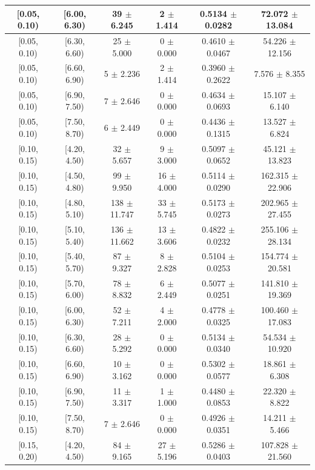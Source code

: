 \begin{longtable}{|c|c|c|c|c|c|}
\hline
[0.05, 0.10) & [6.00, 6.30) & 39 $\pm$ 6.245 & 2 $\pm$ 1.414 & 0.5134 $\pm$ 0.0282 & 72.072 $\pm$ 13.084 \\ 
\hline
[0.05, 0.10) & [6.30, 6.60) & 25 $\pm$ 5.000 & 0 $\pm$ 0.000 & 0.4610 $\pm$ 0.0467 & 54.226 $\pm$ 12.156 \\ 
\hline
[0.05, 0.10) & [6.60, 6.90) & 5 $\pm$ 2.236 & 2 $\pm$ 1.414 & 0.3960 $\pm$ 0.2622 & 7.576 $\pm$ 8.355 \\ 
\hline
[0.05, 0.10) & [6.90, 7.50) & 7 $\pm$ 2.646 & 0 $\pm$ 0.000 & 0.4634 $\pm$ 0.0693 & 15.107 $\pm$ 6.140 \\ 
\hline
[0.05, 0.10) & [7.50, 8.70) & 6 $\pm$ 2.449 & 0 $\pm$ 0.000 & 0.4436 $\pm$ 0.1315 & 13.527 $\pm$ 6.824 \\ 
\hline
[0.10, 0.15) & [4.20, 4.50) & 32 $\pm$ 5.657 & 9 $\pm$ 3.000 & 0.5097 $\pm$ 0.0652 & 45.121 $\pm$ 13.823 \\ 
\hline
[0.10, 0.15) & [4.50, 4.80) & 99 $\pm$ 9.950 & 16 $\pm$ 4.000 & 0.5114 $\pm$ 0.0290 & 162.315 $\pm$ 22.906 \\ 
\hline
[0.10, 0.15) & [4.80, 5.10) & 138 $\pm$ 11.747 & 33 $\pm$ 5.745 & 0.5173 $\pm$ 0.0273 & 202.965 $\pm$ 27.455 \\ 
\hline
[0.10, 0.15) & [5.10, 5.40) & 136 $\pm$ 11.662 & 13 $\pm$ 3.606 & 0.4822 $\pm$ 0.0232 & 255.106 $\pm$ 28.134 \\ 
\hline
[0.10, 0.15) & [5.40, 5.70) & 87 $\pm$ 9.327 & 8 $\pm$ 2.828 & 0.5104 $\pm$ 0.0253 & 154.774 $\pm$ 20.581 \\ 
\hline
[0.10, 0.15) & [5.70, 6.00) & 78 $\pm$ 8.832 & 6 $\pm$ 2.449 & 0.5077 $\pm$ 0.0251 & 141.810 $\pm$ 19.369 \\ 
\hline
[0.10, 0.15) & [6.00, 6.30) & 52 $\pm$ 7.211 & 4 $\pm$ 2.000 & 0.4778 $\pm$ 0.0325 & 100.460 $\pm$ 17.083 \\ 
\hline
[0.10, 0.15) & [6.30, 6.60) & 28 $\pm$ 5.292 & 0 $\pm$ 0.000 & 0.5134 $\pm$ 0.0340 & 54.534 $\pm$ 10.920 \\ 
\hline
[0.10, 0.15) & [6.60, 6.90) & 10 $\pm$ 3.162 & 0 $\pm$ 0.000 & 0.5302 $\pm$ 0.0577 & 18.861 $\pm$ 6.308 \\ 
\hline
[0.10, 0.15) & [6.90, 7.50) & 11 $\pm$ 3.317 & 1 $\pm$ 1.000 & 0.4480 $\pm$ 0.0853 & 22.320 $\pm$ 8.822 \\ 
\hline
[0.10, 0.15) & [7.50, 8.70) & 7 $\pm$ 2.646 & 0 $\pm$ 0.000 & 0.4926 $\pm$ 0.0351 & 14.211 $\pm$ 5.466 \\ 
\hline
[0.15, 0.20) & [4.20, 4.50) & 84 $\pm$ 9.165 & 27 $\pm$ 5.196 & 0.5286 $\pm$ 0.0403 & 107.828 $\pm$ 21.560 \\ 

\end{longtable}

